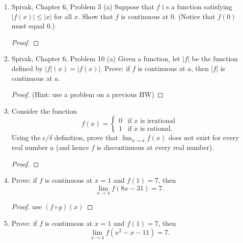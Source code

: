 \documentclass{article} %
\theoremstyle{plain}
\theoremstyle{definition}
\theoremstyle{case}
\newcommand{\abs}[1]{\left\lvert #1 \right\rvert} %
\begin{document}
\begin{enumerate}[label={\fbox{\textbf{Exercise \#\arabic* :}}}]
\begin{enumerate}
      \begin{proof}[Proof of (c)]
        a rational function is any function that can be defined by a rational fraction, which is an algebraic fraction such that both the numerator and the denominator are polynomials. The coefficients of the polynomials need not be rational numbers; 
      \end{proof}
  \end{enumerate}



\newpage
\item Spivak, Chapter 6, Problem 3 (a)
  Suppose that $f$ i s a function satisfying $\abs{f(x)} \leq \abs{x}$
  for all $x$. Show that $f$ is continuous at $0$. (Notice that $f(0)$
  must equal 0.)

\begin{proof}
\end{proof}


\newpage
\item Spivak, Chapter 6, Problem 10 (a)
  Given a function, let $\abs{f}$ be the function defined by
  $\abs{f}(x) = \abs{f(x)}$. Prove: if $f$ is continuous at $a$, then
  $\abs{f}$ is continuous at $a$.

\begin{proof} (Hint: use a problem on a previous HW)
\end{proof}


\newpage
\item Consider the function
$$f(x) = \begin{cases} 0 & \text{if $x$ is irrational} \\
1 & \text{if $x$ is rational.}
\end{cases}
$$
Using the $\epsilon/\delta$ definition, prove that $\lim_{x \rightarrow a} f(x)$ does not exist for every real number $a$ (and hence $f$ is discontinuous at every real number).

\begin{proof}
\end{proof}

\newpage
\item Prove: if $f$ is continuous at $x=1$ and $f(1) = 7$,
then
$$
\lim_{x \rightarrow 4} f(8x-31) = 7.
$$

\begin{proof}
    use $(f \circ g)(x)$
\end{proof}

\newpage
\item Prove: if $f$ is continuous at $x=1$ and $f(1) = 7$,
then
$$
\lim_{x \rightarrow 4} f(x^2-x-11) = 7.
$$


\end{enumerate}
\end{document}
